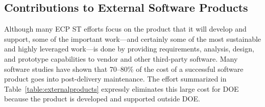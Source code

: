 \subsection{Contributions to External Software Products}\label{subsection:external-contributions}
Although many ECP ST efforts focus on the product that it will develop and support, some of the important work---and certainly some of the most sustainable and highly leveraged work---is done by providing requirements, analysis, design, and prototype capabilities to vendor and other third-party software.  Many software studies have shown that 70--80\% of the cost of a successful software product goes into post-delivery maintenance. The effort summarized in Table~\ref{table:externalproducts} expressly eliminates this large cost for DOE because the product is developed and supported outside DOE.


